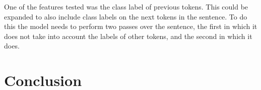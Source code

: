 \documentclass[11pt,oneside]{book}
\begin{document}
One of the features tested was the class label of previous tokens. This could be expanded to also include class labels on the next tokens in the sentence. To do this the model needs to perform two passes over the sentence, the first in which it does not take into account the labels of other tokens, and the second in which it does.

\chapter{Conclusion}



 
 



\begin{appendices}

\end{appendices}
\end{document}
